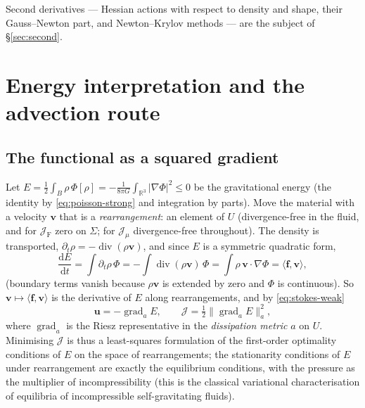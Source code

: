 \documentclass[11pt]{article}
\newcommand{\R}{\mathbb{R}}
\newcommand{\Jf}{\mathscr{J}}  %
\newcommand{\bu}{\mathbf{u}}
\newcommand{\bv}{\mathbf{v}}
\newcommand{\bff}{\mathbf{f}}
\renewcommand{\div}{\operatorname{div}}
\newcommand{\norm}[1]{\lVert #1 \rVert}
\newcommand{\ip}[2]{\langle #1, #2\rangle}
\newcommand{\JF}{\Jf _{\mathrm{F}}}
\newcommand{\Jmu}{\Jf _{\mu}}
\begin{document}
Second derivatives --- Hessian actions with respect to density and
shape, their Gauss--Newton part, and Newton--Krylov methods --- are the
subject of \S\ref{sec:second}.

\section{Energy interpretation and the advection route}
\label{sec:energy}

\subsection{The functional as a squared gradient}

Let $E = \tfrac12\int_B\rho\,\Phi[\rho] = -\frac{1}{8\pi G}\int_{\R^3}
|\nabla\Phi|^2 \le 0$ be the gravitational energy (the identity by
\eqref{eq:poisson-strong} and integration by parts). Move the material
with a velocity $\bv$ that is a \emph{rearrangement}: an element of $U$
(divergence-free in the fluid, and for $\JF$ zero on $\Sigma$; for
$\Jmu$ divergence-free throughout). The density is transported,
$\partial_t\rho = -\div(\rho\bv)$, and since $E$ is a symmetric
quadratic form,
\begin{equation}
  \frac{\mathrm{d}E}{\mathrm{d}t} = \int\partial_t\rho\,\Phi
  = -\int\div(\rho\bv)\,\Phi = \int\rho\,\bv\cdot\nabla\Phi
  = \ip{\bff}{\bv} ,
  \label{eq:dE}
\end{equation}
(boundary terms vanish because $\rho\bv$ is extended by zero and $\Phi$
is continuous). So $\bv\mapsto\ip{\bff}{\bv}$ is the derivative of $E$
along rearrangements, and by \eqref{eq:stokes-weak}
\begin{equation}
  \bu = -\operatorname{grad}_a E ,
  \qquad \Jf  = \tfrac12\norm{\operatorname{grad}_a E}_a^{2} ,
\end{equation}
where $\operatorname{grad}_a$ is the Riesz representative in the
\emph{dissipation metric} $a$ on $U$. Minimising $\Jf $ is thus a
least-squares formulation of the first-order optimality conditions of
$E$ on the space of rearrangements; the stationarity conditions of $E$
under rearrangement are exactly the equilibrium conditions, with the
pressure as the multiplier of incompressibility (this is the classical
variational characterisation of equilibria of incompressible
self-gravitating fluids).
\end{document}
